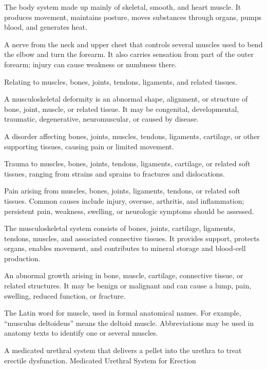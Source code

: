  The body system made up mainly of skeletal, smooth, and heart muscle. It produces movement, maintains posture, moves substances through organs, pumps blood, and generates heat.

 A nerve from the neck and upper chest that controls several muscles used to bend the elbow and turn the forearm. It also carries sensation from part of the outer forearm; injury can cause weakness or numbness there.

 Relating to muscles, bones, joints, tendons, ligaments, and related tissues.

 A musculoskeletal deformity is an abnormal shape, alignment, or structure of bone, joint, muscle, or related tissue. It may be congenital, developmental, traumatic, degenerative, neuromuscular, or caused by disease.

 A disorder affecting bones, joints, muscles, tendons, ligaments, cartilage, or other supporting tissues, causing pain or limited movement.

 Trauma to muscles, bones, joints, tendons, ligaments, cartilage, or related soft tissues, ranging from strains and sprains to fractures and dislocations.

 Pain arising from muscles, bones, joints, ligaments, tendons, or related soft tissues. Common causes
include injury, overuse, arthritis, and inflammation; persistent pain, weakness, swelling, or
neurologic symptoms should be assessed.

 The musculoskeletal system consists of bones, joints, cartilage, ligaments, tendons, muscles, and associated connective tissues. It provides support, protects organs, enables movement, and contributes to mineral storage and blood-cell production.

 An abnormal growth arising in bone, muscle, cartilage, connective tissue, or related structures. It may be benign or malignant and can cause a lump, pain, swelling, reduced function, or fracture.

 The Latin word for muscle, used in formal anatomical names. For example, ``musculus deltoideus'' means the deltoid muscle. Abbreviations may be used in anatomy texts to identify one or several muscles.

 A medicated urethral system that delivers a pellet into the urethra to treat erectile dysfunction.
\synonyms
Medicated Urethral System for Erection

